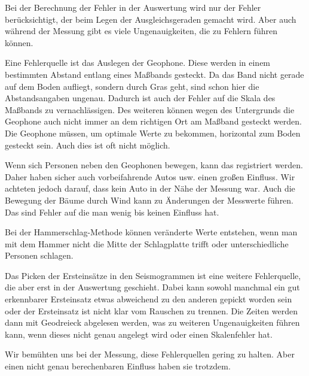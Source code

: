 Bei der Berechnung der Fehler in der Auswertung wird nur der Fehler berücksichtigt, der beim Legen der Ausgleichsgeraden gemacht wird. Aber auch während der Messung gibt es viele Ungenauigkeiten, die zu Fehlern führen können.

Eine Fehlerquelle ist das Auslegen der Geophone. Diese werden in einem bestimmten Abstand entlang eines Maßbands gesteckt. Da das Band nicht gerade auf dem Boden aufliegt, sondern durch Gras geht, sind schon hier die Abstandsangaben ungenau. Dadurch ist auch der Fehler auf die Skala des Maßbands zu vernachlässigen. Des weiteren können wegen des Untergrunds die Geophone auch nicht immer an dem richtigen Ort am Maßband gesteckt werden. Die Geophone müssen, um optimale Werte zu bekommen, horizontal zum Boden gesteckt sein. Auch dies ist oft nicht möglich.

Wenn sich Personen neben den Geophonen bewegen, kann das registriert werden. Daher haben sicher auch vorbeifahrende Autos usw. einen großen Einfluss. Wir achteten jedoch darauf, dass kein Auto in der Nähe der Messung war. Auch die Bewegung der Bäume durch Wind kann zu Änderungen der Messwerte führen. Das sind Fehler auf die man wenig bis keinen Einfluss hat.

Bei der Hammerschlag-Methode können veränderte Werte entstehen, wenn man mit dem Hammer nicht die Mitte der Schlagplatte trifft oder unterschiedliche Personen schlagen.

Das Picken der Ersteinsätze in den Seismogrammen ist eine weitere Fehlerquelle, die aber erst in der Auswertung geschieht. Dabei kann sowohl manchmal ein gut erkennbarer Ersteinsatz etwas abweichend zu den anderen gepickt worden sein oder der Ersteinsatz ist nicht klar vom Rauschen zu trennen. Die Zeiten werden dann mit Geodreieck abgelesen werden, was zu weiteren Ungenauigkeiten führen kann, wenn dieses nicht genau angelegt wird oder einen Skalenfehler hat.

Wir bemühten uns bei der Messung, diese Fehlerquellen gering zu halten. Aber einen nicht genau berechenbaren Einfluss haben sie trotzdem.